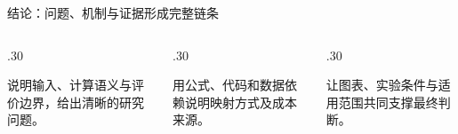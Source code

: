 \begin{frame}{结论：问题、机制与证据形成完整链条}
\vspace{5mm}
\begin{columns}[T,onlytextwidth]
\begin{column}{.30\textwidth}
\vspace{5mm}\par 说明输入、计算语义与评价边界，给出清晰的研究问题。
\end{column}
\begin{column}{.30\textwidth}
\vspace{5mm}\par 用公式、代码和数据依赖说明映射方式及成本来源。
\end{column}
\begin{column}{.30\textwidth}
\vspace{5mm}\par 让图表、实验条件与适用范围共同支撑最终判断。
\end{column}
\end{columns}
\vspace{7mm}
\end{frame}
